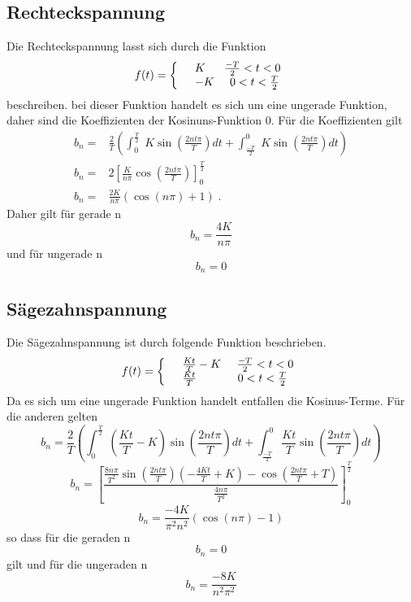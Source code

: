 \subsection{Rechteckspannung}
\label{Rechteckspannung}
Die Rechteckspannung lasst sich durch die Funktion
\begin{equation*}
  f(t)=\left\{
  \begin{array}{l l}
    &K   \;\;\;\;\;\;\frac{-T}{2}<t<0 \\
    &-K  \;\;\;\;\;0<t<\frac{T}{2}
  \end{array}
  \right.
\end{equation*}
beschreiben. bei dieser Funktion handelt es sich um eine ungerade Funktion, daher
sind die Koeffizienten der Kosinuns-Funktion $0$. Für die Koeffizienten gilt
\begin{align*}
  b_n=&\frac{2}{T}\left(\int^{\frac{T}{2}}_0\;K\sin(\frac{2nt\pi}{T})dt+
\int^0_{\frac{-T}{2}}\;K\sin(\frac{2nt\pi}{T})dt\right)\\
  b_n=&2\left[ \frac{K}{n\pi}\cos(\frac{2nt\pi}{T})\right]^{\frac{T}{2}}_0\\
  b_n=&\frac{2K}{n\pi}(\cos(n\pi)+1)\;.
\end{align*}
Daher gilt für gerade n
\begin{equation}
  b_n=\frac{4K}{n\pi}
\end{equation}
 und für ungerade n
\begin{equation}
  b_n=0
\end{equation}
\subsection{Sägezahnspannung}
\label{Saegezahnspannung}
Die Sägezahnspannung ist durch folgende Funktion beschrieben.
\begin{equation*}
  f(t)=\left\{
  \begin{array}{l l}
    &\frac{Kt}{T}-K   \;\;\;\;\;\frac{-T}{2}<t<0 \\
    &\frac{Kt}{T}   \;\;\;\;\;\;\;\;\;\;\;\;\;0<t<\frac{T}{2}
  \end{array}
  \right.
\end{equation*}
Da es sich um eine ungerade Funktion handelt entfallen die Kosinus-Terme. Für die
anderen gelten
\begin{equation*}
  b_n=\frac{2}{T}\left(\int^{\frac{T}{2}}_0\;\left(\frac{Kt}{T}-K\right)
  \sin\left(\frac{2nt\pi}{T}\right)dt +\int^0_{\frac{-T}{2}}\frac{Kt}{T}
  \sin\left(\frac{2nt\pi}{T}\right)dt\right)
\end{equation*}
\begin{equation*}
  b_n=\left[\frac{\frac{8n\pi}{T^2}\sin(\frac{2nt\pi}{T})(-\frac{4Kt}{T}+K)
  -\cos(\frac{2nt\pi}{T}+T)}{\frac{4n\pi}{T^2}}\right]^{\frac{T}{2}}_0
\end{equation*}
\begin{equation*}
  b_n=\frac{-4K}{\pi^2n^2}(\cos(n\pi)-1)
\end{equation*}
so dass für die geraden n
\begin{equation}
  b_n=0
\end{equation}
gilt und für die ungeraden n
\begin{equation}
  b_n=\frac{-8K}{n^2\pi^2}
\end{equation}
